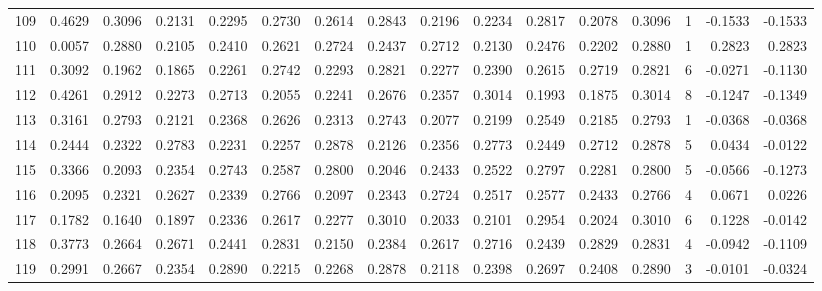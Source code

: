 \begin{tabular}{lrrrrrrrrrrrrrrr}
109 &      0.4629 &  0.3096 &  0.2131 &  0.2295 &  0.2730 &  0.2614 &  0.2843 &  0.2196 &  0.2234 &  0.2817 &   0.2078 &     0.3096 &      1 &                   -0.1533 &                    -0.1533 \\
110 &      0.0057 &  0.2880 &  0.2105 &  0.2410 &  0.2621 &  0.2724 &  0.2437 &  0.2712 &  0.2130 &  0.2476 &   0.2202 &     0.2880 &      1 &                    0.2823 &                     0.2823 \\
111 &      0.3092 &  0.1962 &  0.1865 &  0.2261 &  0.2742 &  0.2293 &  0.2821 &  0.2277 &  0.2390 &  0.2615 &   0.2719 &     0.2821 &      6 &                   -0.0271 &                    -0.1130 \\
112 &      0.4261 &  0.2912 &  0.2273 &  0.2713 &  0.2055 &  0.2241 &  0.2676 &  0.2357 &  0.3014 &  0.1993 &   0.1875 &     0.3014 &      8 &                   -0.1247 &                    -0.1349 \\
113 &      0.3161 &  0.2793 &  0.2121 &  0.2368 &  0.2626 &  0.2313 &  0.2743 &  0.2077 &  0.2199 &  0.2549 &   0.2185 &     0.2793 &      1 &                   -0.0368 &                    -0.0368 \\
114 &      0.2444 &  0.2322 &  0.2783 &  0.2231 &  0.2257 &  0.2878 &  0.2126 &  0.2356 &  0.2773 &  0.2449 &   0.2712 &     0.2878 &      5 &                    0.0434 &                    -0.0122 \\
115 &      0.3366 &  0.2093 &  0.2354 &  0.2743 &  0.2587 &  0.2800 &  0.2046 &  0.2433 &  0.2522 &  0.2797 &   0.2281 &     0.2800 &      5 &                   -0.0566 &                    -0.1273 \\
116 &      0.2095 &  0.2321 &  0.2627 &  0.2339 &  0.2766 &  0.2097 &  0.2343 &  0.2724 &  0.2517 &  0.2577 &   0.2433 &     0.2766 &      4 &                    0.0671 &                     0.0226 \\
117 &      0.1782 &  0.1640 &  0.1897 &  0.2336 &  0.2617 &  0.2277 &  0.3010 &  0.2033 &  0.2101 &  0.2954 &   0.2024 &     0.3010 &      6 &                    0.1228 &                    -0.0142 \\
118 &      0.3773 &  0.2664 &  0.2671 &  0.2441 &  0.2831 &  0.2150 &  0.2384 &  0.2617 &  0.2716 &  0.2439 &   0.2829 &     0.2831 &      4 &                   -0.0942 &                    -0.1109 \\
119 &      0.2991 &  0.2667 &  0.2354 &  0.2890 &  0.2215 &  0.2268 &  0.2878 &  0.2118 &  0.2398 &  0.2697 &   0.2408 &     0.2890 &      3 &                   -0.0101 &                    -0.0324 \\

\end{tabular}
